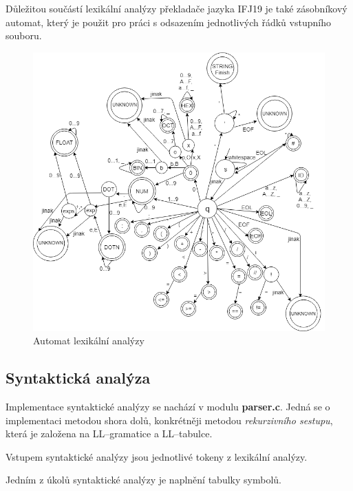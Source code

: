 \documentclass[12pt]{article}
\begin{document}
Důležitou součástí lexikální analýzy překladače jazyka IFJ19 je také zásobníkový automat, který je použit pro práci s odsazením jednotlivých řádků vstupního souboru.
\begin{figure}[!htbp]
    \centering
    \includegraphics[width = \textwidth]{img/Lexical_Analysis.png}
	\caption{Automat lexikální analýzy}
    \label{obr:1}
\end{figure}
\clearpage
\subsection{Syntaktická analýza}
Implementace syntaktické analýzy se nachází v modulu \textbf{parser.c}. Jedná se o implementaci metodou shora dolů, konkrétněji metodou \textit{rekurzivního sestupu}, která je založena na LL--gramatice a LL--tabulce.

Vstupem syntaktické analýzy jsou jednotlivé tokeny z lexikální analýzy.

Jedním z úkolů syntaktické analýzy je naplnění tabulky symbolů.
\end{document}
